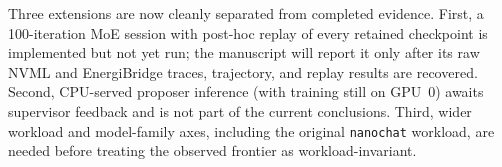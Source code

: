 Three extensions are now cleanly separated from completed evidence. First, a
100-iteration MoE session with post-hoc replay of every retained checkpoint is
implemented but not yet run; the manuscript will report it only after its raw
NVML and EnergiBridge traces, trajectory, and replay results are recovered.
Second, CPU-served proposer inference (with training still on GPU~0) awaits
supervisor feedback and is not part of the current conclusions. Third, wider
workload and model-family axes, including the original \texttt{nanochat} workload,
are needed before treating the observed frontier as workload-invariant.
